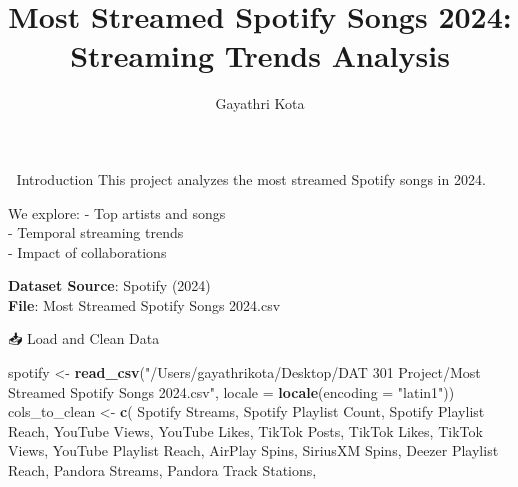 \documentclass[
  ignorenonframetext,
]{beamer}
\title{Most Streamed Spotify Songs 2024: Streaming Trends Analysis}
\author{Gayathri Kota}
\date{}
\newenvironment{Shaded}{\begin{snugshade}}{\end{snugshade}}
\newcommand{\AttributeTok}[1]{\textcolor[rgb]{0.13,0.29,0.53}{#1}}
\newcommand{\FunctionTok}[1]{\textcolor[rgb]{0.13,0.29,0.53}{\textbf{#1}}}
\newcommand{\NormalTok}[1]{#1}
\newcommand{\OtherTok}[1]{\textcolor[rgb]{0.56,0.35,0.01}{#1}}
\newcommand{\StringTok}[1]{\textcolor[rgb]{0.31,0.60,0.02}{#1}}
\begin{document}
\frame{\titlepage}

\begin{frame}
\end{frame}

\begin{frame}{🎯 Introduction}
\label{introduction}
This project analyzes the most streamed Spotify songs in 2024.

We explore: - Top artists and songs\\
- Temporal streaming trends\\
- Impact of collaborations

\textbf{Dataset Source}: Spotify (2024)\\
\textbf{File}: Most Streamed Spotify Songs 2024.csv
\end{frame}

\begin{frame}[fragile]{📥 Load and Clean Data}
\label{load-and-clean-data}
\begin{Shaded}
\begin{Highlighting}[]
\NormalTok{spotify }\OtherTok{\textless{}{-}} \FunctionTok{read\_csv}\NormalTok{(}\StringTok{"/Users/gayathrikota/Desktop/DAT 301 Project/Most Streamed Spotify Songs 2024.csv"}\NormalTok{, }
                    \AttributeTok{locale =} \FunctionTok{locale}\NormalTok{(}\AttributeTok{encoding =} \StringTok{"latin1"}\NormalTok{))}
\NormalTok{cols\_to\_clean }\OtherTok{\textless{}{-}} \FunctionTok{c}\NormalTok{(}
  \StringTok{\textquotesingle{}Spotify Streams\textquotesingle{}}\NormalTok{, }\StringTok{\textquotesingle{}Spotify Playlist Count\textquotesingle{}}\NormalTok{, }\StringTok{\textquotesingle{}Spotify Playlist Reach\textquotesingle{}}\NormalTok{,}
  \StringTok{\textquotesingle{}YouTube Views\textquotesingle{}}\NormalTok{, }\StringTok{\textquotesingle{}YouTube Likes\textquotesingle{}}\NormalTok{, }\StringTok{\textquotesingle{}TikTok Posts\textquotesingle{}}\NormalTok{, }\StringTok{\textquotesingle{}TikTok Likes\textquotesingle{}}\NormalTok{,}
  \StringTok{\textquotesingle{}TikTok Views\textquotesingle{}}\NormalTok{, }\StringTok{\textquotesingle{}YouTube Playlist Reach\textquotesingle{}}\NormalTok{, }\StringTok{\textquotesingle{}AirPlay Spins\textquotesingle{}}\NormalTok{, }\StringTok{\textquotesingle{}SiriusXM Spins\textquotesingle{}}\NormalTok{,}
  \StringTok{\textquotesingle{}Deezer Playlist Reach\textquotesingle{}}\NormalTok{, }\StringTok{\textquotesingle{}Pandora Streams\textquotesingle{}}\NormalTok{, }\StringTok{\textquotesingle{}Pandora Track Stations\textquotesingle{}}\NormalTok{,}

\end{Highlighting}
\end{Shaded}
\end{frame}
\end{document}
